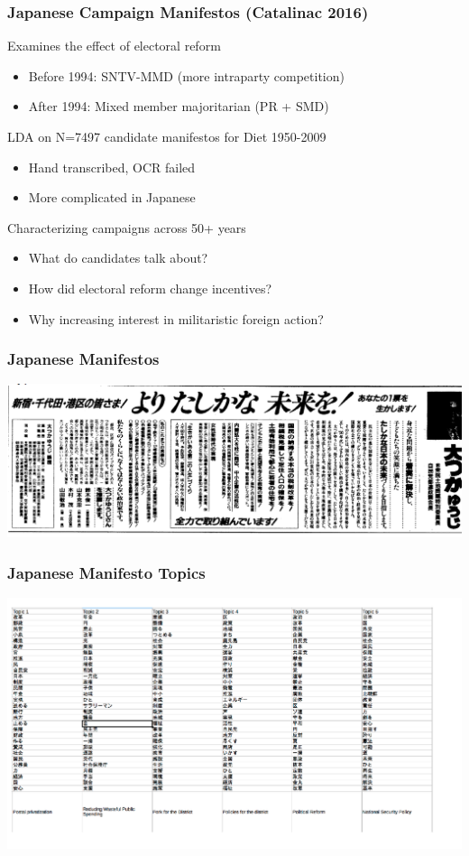 \documentclass[11pt,compress,professionalfonts]{beamer}
\newcommand{\ita}{\begin{itemize}}
\newcommand{\itm}{\item[]}
\newcommand{\itz}{\end{itemize}}
\begin{document}

\begin{frame}[t,fragile]\frametitle{Japanese Campaign Manifestos (Catalinac 2016)}
Examines the effect of electoral reform
\ita
\itm Before 1994: SNTV-MMD (more intraparty competition)
\itm After 1994: Mixed member majoritarian (PR + SMD)
\itz
LDA on N=7497 candidate manifestos for Diet 1950-2009
\ita
\itm Hand transcribed, OCR failed
\itm More complicated in Japanese
\itz
Characterizing campaigns across 50+ years
\ita
\itm What do candidates talk about?
\itm How did electoral reform change incentives?
\itm Why increasing interest in militaristic foreign action? 
\itz
\end{frame}

\begin{frame}[t,fragile]\frametitle{Japanese Manifestos}
\vspace{10 mm}
\centerline{\includegraphics[scale=.27]{pictures/jpmanifesto.png}}
\end{frame}


\begin{frame}[t,fragile]\frametitle{Japanese Manifesto Topics}
\vspace{10 mm}
\centerline{\includegraphics[scale=.27]{pictures/jptopic.png}}
\end{frame}
\end{document}
